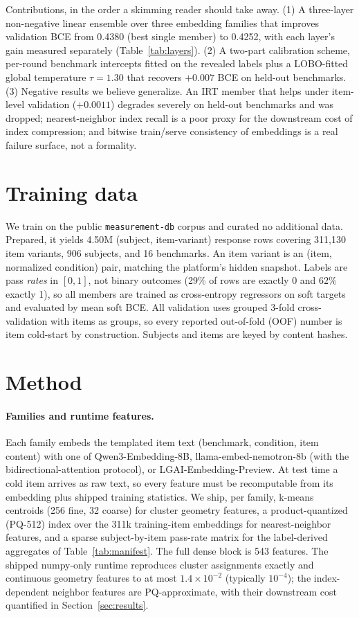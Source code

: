 \documentclass{article}
\begin{document}
Contributions, in the order a skimming reader should take away. (1) A three-layer non-negative linear ensemble over three embedding families that improves validation BCE from 0.4380 (best single member) to 0.4252, with each layer's gain measured separately (Table~\ref{tab:layers}). (2) A two-part calibration scheme, per-round benchmark intercepts fitted on the revealed labels plus a LOBO-fitted global temperature $\tau=1.30$ that recovers $+0.007$ BCE on held-out benchmarks. (3) Negative results we believe generalize. An IRT member that helps under item-level validation ($+0.0011$) degrades severely on held-out benchmarks and was dropped; nearest-neighbor index recall is a poor proxy for the downstream cost of index compression; and bitwise train/serve consistency of embeddings is a real failure surface, not a formality.

\section{Training data}

We train on the public \texttt{measurement-db} corpus and curated no additional data. Prepared, it yields 4.50M (subject, item-variant) response rows covering 311{,}130 item variants, 906 subjects, and 16 benchmarks. An item variant is an (item, normalized condition) pair, matching the platform's hidden snapshot. Labels are pass \emph{rates} in $[0,1]$, not binary outcomes (29\% of rows are exactly 0 and 62\% exactly 1), so all members are trained as cross-entropy regressors on soft targets and evaluated by mean soft BCE. All validation uses grouped 3-fold cross-validation with items as groups, so every reported out-of-fold (OOF) number is item cold-start by construction. Subjects and items are keyed by content hashes.

\section{Method}

\paragraph{Families and runtime features.}
Each family embeds the templated item text (benchmark, condition, item content) with one of Qwen3-Embedding-8B, llama-embed-nemotron-8b (with the bidirectional-attention protocol), or LGAI-Embedding-Preview. At test time a cold item arrives as raw text, so every feature must be recomputable from its embedding plus shipped training statistics. We ship, per family, k-means centroids (256 fine, 32 coarse) for cluster geometry features, a product-quantized (PQ-512) index over the 311k training-item embeddings for nearest-neighbor features, and a sparse subject-by-item pass-rate matrix for the label-derived aggregates of Table~\ref{tab:manifest}. The full dense block is 543 features. The shipped numpy-only runtime reproduces cluster assignments exactly and continuous geometry features to at most $1.4\times10^{-2}$ (typically $10^{-4}$); the index-dependent neighbor features are PQ-approximate, with their downstream cost quantified in Section~\ref{sec:results}.
\end{document}
